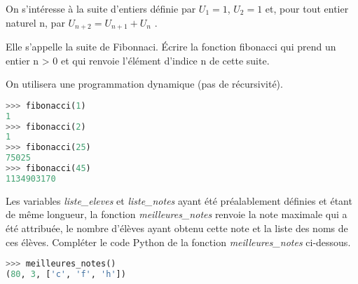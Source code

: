 \documentclass[a4paper,11pt]{article}
\begin{document}
\begin{exo}
    On s’intéresse à la suite d’entiers définie par
    $U_ 1 = 1$, $U_2 = 1$ et, pour tout entier naturel n, par $U_{n+2} = U_{n+1} + U_n$ .

    Elle s’appelle la suite de Fibonnaci.
    Écrire la fonction fibonacci qui prend un entier n > 0 et qui renvoie l’élément d’indice n de cette suite.

    On utilisera une programmation dynamique (pas de récursivité).

    \begin{center}
    \begin{lstlisting}[language=Python]
>>> fibonacci(1)
1
>>> fibonacci(2)
1
>>> fibonacci(25)
75025
>>> fibonacci(45)
1134903170   
    \end{lstlisting}
    \label{CODE}
    \end{center}
    
\end{exo}
\begin{exo}
    Les variables \emph{liste\_eleves} et \emph{liste\_notes} ayant été préalablement définies et étant
    de même longueur, la fonction \emph{meilleures\_notes} renvoie la note maximale qui a été
    attribuée, le nombre d’élèves ayant obtenu cette note et la liste des noms de ces élèves.
    Compléter le code Python de la fonction \emph{meilleures\_notes} ci-dessous.

\begin{center}
\begin{lstlisting}[language=Python]
>>> meilleures_notes()
(80, 3, ['c', 'f', 'h'])
\end{lstlisting}
\label{CODE}
\end{center}
\end{exo}
\end{document}
